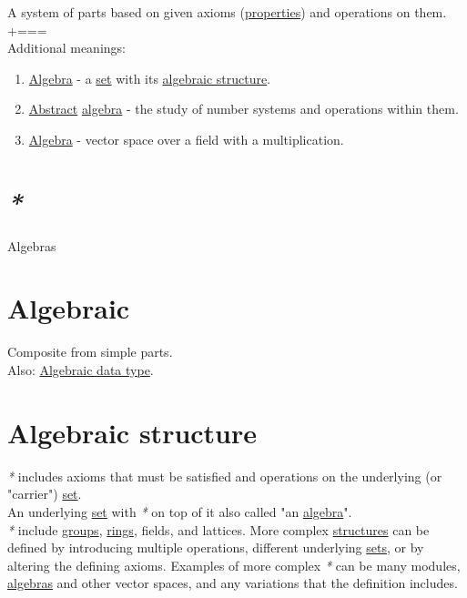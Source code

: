\documentclass[a4paper,14pt,oneside]{book}
\newcommand{\additional}{{\scriptsize +===}}    %
\begin{document}
A system of parts based on given axioms (\hyperref[org7d3e89a]{properties}) and operations on them.\\


\additional\\

Additional meanings:\\

\begin{enumerate}
\item \hyperref[orgfbc73b0]{Algebra} - a \hyperref[orgbe2ddb3]{set} with its \hyperref[org84cc142]{algebraic structure}.\\
\item \hyperref[org89ae0ec]{Abstract} \hyperref[orgfbc73b0]{algebra} - the study of number systems and operations within them.\\
\item \hyperref[orgfbc73b0]{Algebra} - vector space over a field with a multiplication.\\
\end{enumerate}

\section{\emph{*}}
\label{sec:org9802bdb}

\label{orga3042da}Algebras\\

\section{\label{org6c7e86d}Algebraic}
\label{sec:org32b0732}
Composite from simple parts.\\

Also: \hyperref[org30888d6]{Algebraic data type}.\\

\section{\label{org84cc142}Algebraic structure}
\label{sec:org4645ade}
\emph{*} includes axioms that must be satisfied and operations on the underlying (or "carrier") \hyperref[orgbe2ddb3]{set}.\\

An underlying \hyperref[orgbe2ddb3]{set} with \emph{*} on top of it also called "an \hyperref[orgfbc73b0]{algebra}".\\

\emph{*} include \hyperref[orgd3ecfa2]{groups}, \hyperref[org45a7662]{rings}, fields, and lattices. More complex \hyperref[org0bf9d04]{structures} can be defined by introducing multiple operations, different underlying \hyperref[orgaae622f]{sets}, or by altering the defining axioms. Examples of more complex \emph{*} can be many modules, \hyperref[orga3042da]{algebras} and other vector spaces, and any variations that the definition includes.\\
\end{document}
